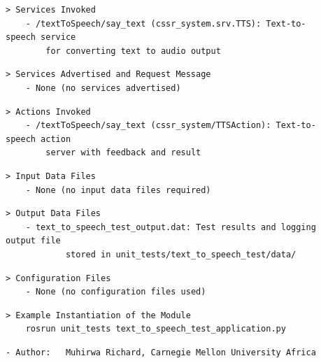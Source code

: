 \documentclass{CSSRforAfrica}
\newcommand{\checkboxChecked}{\fbox{\ding{51}}} %
\begin{document}
\begin{description}
\item[\checkboxChecked]
{\small
\begin{verbatim}
> Services Invoked
    - /textToSpeech/say_text (cssr_system.srv.TTS): Text-to-speech service
        for converting text to audio output
\end{verbatim}}


\item[\checkboxChecked]
{\small
\begin{verbatim}
> Services Advertised and Request Message
    - None (no services advertised)
\end{verbatim}}

\item[\checkboxChecked]
{\small
\begin{verbatim}
> Actions Invoked
    - /textToSpeech/say_text (cssr_system/TTSAction): Text-to-speech action
        server with feedback and result
\end{verbatim}}

\item[\checkboxChecked] 
{\small 
\begin{verbatim}
> Input Data Files
    - None (no input data files required)
\end{verbatim}}

\item[\checkboxChecked] 
{\small 
\begin{verbatim}
> Output Data Files
    - text_to_speech_test_output.dat: Test results and logging output file
            stored in unit_tests/text_to_speech_test/data/
\end{verbatim}}

\item[\checkboxChecked] 
{\small 
\begin{verbatim}
> Configuration Files
    - None (no configuration files used)
\end{verbatim}}

\item[\checkboxChecked] 
{\small 
\begin{verbatim}
> Example Instantiation of the Module
    rosrun unit_tests text_to_speech_test_application.py
\end{verbatim}}

\item[\checkboxChecked] 
 {\small 
\begin{verbatim}
- Author:   Muhirwa Richard, Carnegie Mellon University Africa
\end{verbatim}}


\end{description}
\end{document}
